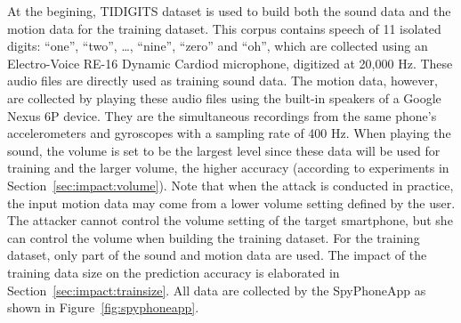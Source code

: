 At the begining, TIDIGITS dataset is used to build both the sound data and the motion data for the training dataset.
%
This corpus contains speech of 11 isolated digits: ``one'', ``two'', \ldots, ``nine'', ``zero'' and ``oh'', which are collected using an Electro-Voice RE-16 Dynamic Cardiod microphone, digitized at 20,000 Hz.
%
%
These audio files are directly used as training sound data. 
The motion data, however, are collected by playing these audio files using the built-in speakers of a Google Nexus 6P device. They are the simultaneous recordings from the same phone's  accelerometers and gyroscopes with a sampling rate of 400 Hz.
When playing the sound, the volume is set to be the largest level since these data will be used for training and the larger volume, the higher accuracy (according to experiments in Section~\ref{sec:impact:volume}).
Note that when the {\attackName} attack is conducted in practice, the input motion data may come from a lower volume setting defined by the user. The attacker cannot control the volume setting of the target smartphone, but she can control the volume when building the training dataset. 
%
For the training dataset, only part of the sound and motion data are used. The impact of the training data size on the prediction accuracy is elaborated in Section~\ref{sec:impact:trainsize}.
All data are collected by the SpyPhoneApp as shown in Figure~\ref{fig:spyphoneapp}.







%
%

%


